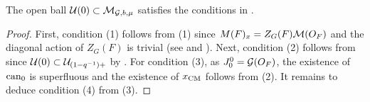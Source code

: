 \documentclass[12pt,reqno]{amsart}
\begin{document}
\begin{prop} \label{prop:verification_at_depth_zero}
    The open ball ${\mathcal{U}}(0) \subset {\mathcal{M}}_{{\mathcal{G}}, b, \mu}$ satisfies the conditions in . 
\end{prop}
\begin{proof}
    First, condition (1) follows from  (1) since $M(F)_x = Z_G(F) {\mathcal{M}}(O_F)$ and the diagonal action of $Z_G(F)$ is trivial (see  and ). Next, condition (2) follows from  since ${\mathcal{U}}(0) \subset {\mathcal{U}}_{(1 - q^{-1})+}$ by . For condition (3), as $J_0^0 = {\mathcal{G}}(O_F)$, the existence of ${\operatorname{can}}_0$ is superfluous and the existence of $x_{\operatorname{CM}}$ follows from  (2). It remains to deduce condition (4) from  (3). 
    

\end{proof}
\end{document}
